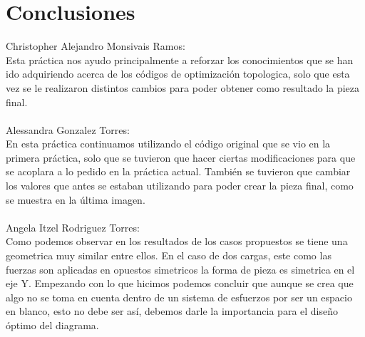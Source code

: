 \documentclass{article}
\begin{document}
\newpage
\newpage

\section{Conclusiones}

Christopher Alejandro Monsivais Ramos: 
\\Esta práctica nos ayudo principalmente a reforzar los conocimientos que se han ido adquiriendo acerca de los códigos de optimización topologica, solo que esta vez se le realizaron distintos cambios para poder obtener como resultado la pieza final.
\\
\\
Alessandra Gonzalez Torres: 
\\En esta práctica continuamos utilizando el código original que se vio en la primera práctica, solo que se tuvieron que hacer ciertas modificaciones para que se acoplara a lo pedido en la práctica actual. También se tuvieron que cambiar los valores que antes se estaban utilizando para poder crear la pieza final, como se muestra en la última imagen.
\\
\\
Angela Itzel Rodriguez Torres: 
\\Como podemos observar en los resultados de los casos propuestos se tiene una geometrica muy similar entre ellos. En el caso de dos cargas, este como las fuerzas son aplicadas en opuestos simetricos la forma de pieza es simetrica en el eje Y.
Empezando con lo que hicimos podemos concluir que aunque se crea que algo no se toma en cuenta dentro de un sistema de esfuerzos por ser un espacio en blanco, esto no debe ser así, debemos darle la importancia para el diseño óptimo del diagrama.
\end{document}

